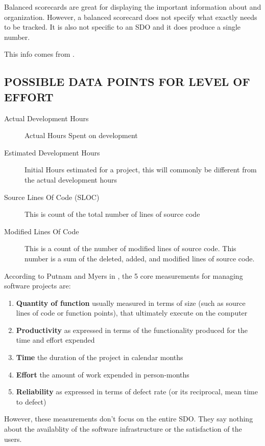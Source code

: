 \documentclass[SDSUThesis.tex]{subfiles}
\begin{document}
Balanced scorecards are great for displaying the important information about
and organization.  However, a balanced scorecard does not specify what
exactly needs to be tracked.  It is also not specific to an SDO and 
it does produce a single number.

This info comes from \cite{parmenter2010}.

\subsection{POSSIBLE DATA POINTS FOR LEVEL OF EFFORT}

\begin{description}
    \item[Actual Development Hours] Actual Hours Spent on development
    \item[Estimated Development Hours]  Initial Hours estimated for a project, this will commonly be different from the actual development hours
    \item[Source Lines Of Code (SLOC)]  This is count of the total number of lines of source code
    \item[Modified Lines Of Code] This is a count of the number of modified lines of source code. This number is a sum of the deleted, added, and modified lines of source code.
\end{description}

According to Putnam and Myers in \cite{Putnam2013}, the 5 core measurements for managing software
projects are:

\begin{enumerate}
    \item \textbf{Quantity of function} usually measured in terms of size (such as source lines of code or function points), that ultimately execute on the computer
    \item \textbf{Productivity} as expressed in terms of the functionality produced for the time and effort expended
    \item \textbf{Time} the duration of the project in calendar months
    \item \textbf{Effort} the amount of work expended in person-months
    \item \textbf{Reliability} as expressed in terms of defect rate (or its reciprocal, mean time to defect)
\end{enumerate}
However, these measurements don't focus on the entire SDO. They say nothing about the availablity of the software infrastructure or the satisfaction of the users.
\end{document}
